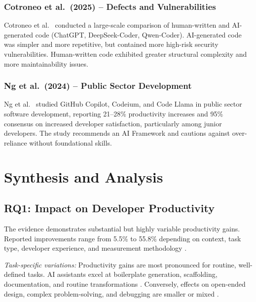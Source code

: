 \documentclass[journal,twoside,10pt]{IEEEtran}
\begin{document}
\subsubsection{Cotroneo et al.\ (2025) -- Defects and Vulnerabilities}
Cotroneo et al.~\cite{cotroneo2025defects} conducted a large-scale comparison of
human-written and AI-generated code (ChatGPT, DeepSeek-Coder, Qwen-Coder).
AI-generated code was simpler and more repetitive, but contained more high-risk
security vulnerabilities. Human-written code exhibited greater structural
complexity and more maintainability issues.

\subsubsection{Ng et al.\ (2024) -- Public Sector Development}
Ng et al.~\cite{ng2024publicsector} studied GitHub Copilot, Codeium, and Code
Llama in public sector software development, reporting 21--28\% productivity
increases and 95\% consensus on increased developer satisfaction, particularly
among junior developers. The study recommends an AI Framework and cautions
against over-reliance without foundational skills.

\section{Synthesis and Analysis}
\label{sec:synthesis}

\subsection{RQ1: Impact on Developer Productivity}

The evidence demonstrates substantial but highly variable productivity gains.
Reported improvements range from 5.5\% to 55.8\% depending on context, task
type, developer experience, and measurement methodology
\cite{pandey2024copilot,shihab2025brownfield,swaraj2025llm,urs2025trust,%
song2024opensource,agarwal2025corporate,ng2024publicsector}.

\textit{Task-specific variations:} Productivity gains are most pronounced for
routine, well-defined tasks. AI assistants excel at boilerplate generation,
scaffolding, documentation, and routine transformations
\cite{adepoju2023copilot,swaraj2025llm,anon2025agile,mohamed2025slr}.
Conversely, effects on open-ended design, complex problem-solving, and debugging
are smaller or mixed \cite{adepoju2023copilot,gokalp2025pair,pandey2024copilot}.
\end{document}
